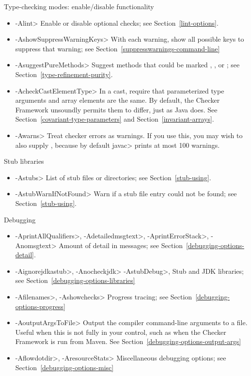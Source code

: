 Type-checking modes:  enable/disable functionality
\begin{itemize}
\item \<-Alint>
  Enable or disable optional checks; see Section~\ref{lint-options}.
\item \<-AshowSuppressWarningKeys>
  With each warning, show all possible keys to suppress that warning;
  see Section~\ref{suppresswarnings-command-line}
\item \<-AsuggestPureMethods>
  Suggest methods that could be marked
  ,
  ,
  or ; see
  Section~\ref{type-refinement-purity}.
\item \<-AcheckCastElementType>
  In a cast, require that parameterized type arguments and array elements
  are the same.  By default, the Checker Framework unsoundly permits them
  to differ, just as Java does.  See Section~\ref{covariant-type-parameters}
  and Section~\ref{invariant-arrays}.
\item \<-Awarns>
  Treat checker errors as warnings.  If you use this, you
  may wish to also supply , because by default
  \<javac> prints at most 100 warnings.
\end{itemize}

Stub libraries
\begin{itemize}
\item \<-Astubs>
  List of stub files or directories; see Section~\ref{stub-using}.
\item \<-AstubWarnIfNotFound>
  Warn if a stub file entry could not be found; see Section~\ref{stub-using}.
\end{itemize}

Debugging
\begin{itemize}
\item
 \<-AprintAllQualifiers>,
 \<-Adetailedmsgtext>,
 \<-AprintErrorStack>,
 \<-Anomsgtext>
Amount of detail in messages; see Section~\ref{debugging-options-detail}.

\item
 \<-Aignorejdkastub>,
 \<-Anocheckjdk>
 \<-AstubDebug>,
Stub and JDK libraries; see Section~\ref{debugging-options-libraries}

\item
 \<-Afilenames>,
 \<-Ashowchecks>
Progress tracing; see Section~\ref{debugging-options-progress}

\item
\<-AoutputArgsToFile>
Output the compiler command-line arguments to a file.  Useful when this is not
fully in your control, such as when the Checker Framework is run from Maven.
See Section~\ref{debugging-options-output-args}

\item
 \<-Aflowdotdir>,
 \<-AresourceStats>
Miscellaneous debugging options; see Section~\ref{debugging-options-misc}
\end{itemize}


